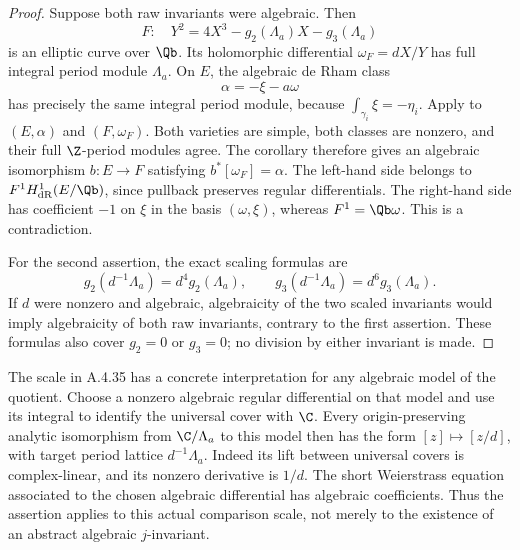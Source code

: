 \begin{proof}
Suppose both raw invariants were algebraic. Then
\[
 F:\quad Y^2=4X^3-g_2(\Lambda_a)X-g_3(\Lambda_a)
\]
is an elliptic curve over $\Qb$. Its holomorphic differential
$\omega_F=dX/Y$ has full integral period module $\Lambda_a$.
On $E$, the algebraic de Rham class
\[
 \alpha=-\xi-a\omega
\]
has precisely the same integral period module, because
$\int_{\gamma_i}\xi=-\eta_i$.
Apply \cite[Corollary 2, p.14 of the opened version]{EllMovasati2008}
to $(E,\alpha)$ and $(F,\omega_F)$.
Both varieties are simple, both classes are nonzero, and their full
$\Z$-period modules agree. The corollary therefore gives an algebraic
isomorphism $b:E\longrightarrow F$ satisfying
$b^*[\omega_F]=\alpha$.
The left-hand side belongs to $F^1H^1_{\mathrm{dR}}(E/\Qb)$,
since pullback preserves regular differentials. The right-hand
side has coefficient $-1$ on $\xi$ in the basis $(\omega,\xi)$,
whereas $F^1=\Qb\omega$. This is a contradiction.

For the second assertion, the exact scaling formulas are
\[
 g_2(d^{-1}\Lambda_a)=d^4g_2(\Lambda_a),\qquad
 g_3(d^{-1}\Lambda_a)=d^6g_3(\Lambda_a).
\]
If $d$ were nonzero and algebraic, algebraicity of the two scaled
invariants would imply algebraicity of both raw invariants, contrary
to the first assertion. These formulas also cover $g_2=0$ or $g_3=0$;
no division by either invariant is made.
\end{proof}

The scale in A.4.35 has a concrete interpretation for any algebraic
model of the quotient. Choose a nonzero algebraic regular differential
on that model and use its integral to identify the universal cover
with $\C$. Every origin-preserving analytic isomorphism from
$\C/\Lambda_a$ to this model then has the form
$[z]\mapsto[z/d]$, with target period lattice $d^{-1}\Lambda_a$.
Indeed its lift between universal covers is complex-linear, and its
nonzero derivative is $1/d$. The short Weierstrass equation associated
to the chosen algebraic differential has algebraic coefficients.
Thus the assertion applies to this actual comparison scale, not
merely to the existence of an abstract algebraic $j$-invariant.

